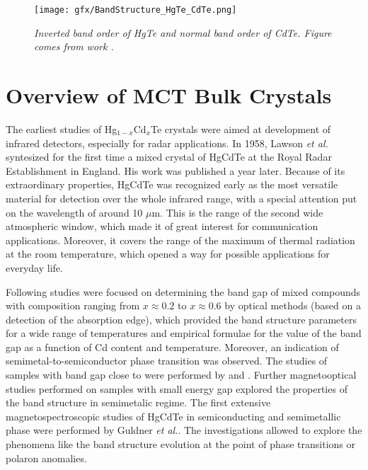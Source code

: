 \documentclass[titlepage,a4paper]{book}
\newcommand{\wciecie}{\quad\phantom{v}}
\begin{document}
\begin{figure}[ht]
	\centering
	\texttt{[image: gfx/BandStructure\_HgTe\_CdTe.png]}
	\vspace{-10pt}
	\caption{\textit{Inverted band order of HgTe and normal band order of CdTe. Figure comes from work \cite{Bernevig_Topology2}.}}
	\label{fig:BandStructure_HgTe_CdTe}
\end{figure} 

\clearpage
\section{Overview of MCT Bulk Crystals}
\wciecie
The earliest studies of Hg$_{1-x}$Cd$_x$Te crystals were aimed at development of infrared detectors, especially for radar applications. In 1958, Lawson \textit{et al.} syntesized for the first time a mixed crystal of HgCdTe at the Royal Radar Establishment in England. His work was published \cite{Lawson_MCT} a year later. Because of its extraordinary properties, HgCdTe was recognized early as the most versatile material for detection over the whole infrared range, with a special attention put on the wavelength of around 10 $\mu$m. This is the range of the second wide atmospheric window, which made it of great interest for communication applications. Moreover, it covers the range of the maximum of thermal radiation at the room temperature, which opened a way for possible applications for everyday life. 

Following studies were focused on determining the band gap of mixed compounds with composition ranging from $x \approx 0.2$ to $x \approx 0.6$ by optical methods \cite{Schmit_MCT_bulk}\cite{Scott_MCT_bulk} (based on a detection of the absorption edge), which provided the band structure parameters for a wide range of temperatures and empirical formulae for the value of the band gap as a function of Cd content and temperature. Moreover, an indication of semimetal-to-semiconductor phase transition was observed. The studies of samples with band gap close to were performed by \cite{Groves_MCT_bulk} and \cite{Saur_MCT_bulk}. Further magnetooptical studies performed on samples with small energy gap \cite{Kim_MCT_bulk} explored the properties of the band structure in semimetalic regime. The first extensive magnetospectroscopic studies of HgCdTe in semiconducting \cite{Guldner_MCT_bulk1} and semimetallic \cite{Guldner_MCT_bulk2} phase were performed by Guldner \textit{et al.}. The investigations allowed to explore the phenomena like the band structure evolution at the point of phase transitions or polaron anomalies.
\end{document}

